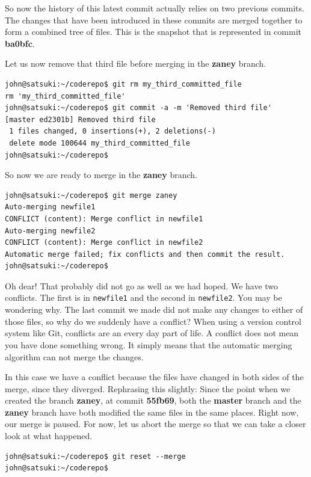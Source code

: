 So now the history of this latest commit actually relies on two previous commits.
The changes that have been introduced in these commits are merged together to form a combined tree of files.
This is the snapshot that is represented in commit \textbf{ba0bfc}.

Let us now remove that third file before merging in the \textbf{zaney} branch.

\begin{Verbatim}
john@satsuki:~/coderepo$ git rm my_third_committed_file
rm 'my_third_committed_file'
john@satsuki:~/coderepo$ git commit -a -m 'Removed third file'
[master ed2301b] Removed third file
 1 files changed, 0 insertions(+), 2 deletions(-)
 delete mode 100644 my_third_committed_file
john@satsuki:~/coderepo$
\end{Verbatim}

So now we are ready to merge in the \textbf{zaney} branch.

\begin{Verbatim}
john@satsuki:~/coderepo$ git merge zaney
Auto-merging newfile1
CONFLICT (content): Merge conflict in newfile1
Auto-merging newfile2
CONFLICT (content): Merge conflict in newfile2
Automatic merge failed; fix conflicts and then commit the result.
john@satsuki:~/coderepo$
\end{Verbatim}

Oh dear!  That probably did not go as well as we had hoped.
We have two conflicts.
The first is in \texttt{newfile1} and the second in \texttt{newfile2}.
You may be wondering why.
The last commit we made did not make any changes to either of those files, so why do we suddenly have a conflict?  When using a version control system like Git, conflicts are an every day part of life.
A conflict does not mean you have done something wrong.
It simply means that the automatic merging algorithm can not merge the changes.

In this case we have a conflict because the files have changed in both sides of the merge, since they diverged.
Rephrasing this slightly: Since the point when we created the branch \textbf{zaney}, at commit \textbf{55fb69}, both the \textbf{master} branch and the \textbf{zaney} branch have both modified the same files in the same places.
Right now, our merge is paused.
For now, let us abort the merge so that we can take a closer look at what happened.

\begin{Verbatim}
john@satsuki:~/coderepo$ git reset --merge
john@satsuki:~/coderepo$
\end{Verbatim}

